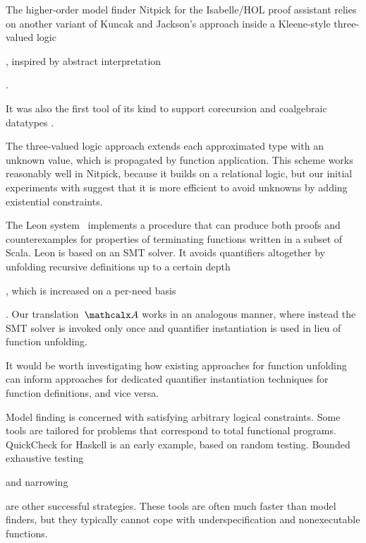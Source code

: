 The higher-order model finder Nitpick \cite{blanchette-nipkow-2010}
for the Isabelle/HOL proof assistant
relies on another variant of Kuncak and Jackson's approach inside a
Kleene-style three-valued logic\begin{rep}, inspired by abstract interpretation\end{rep}.
\begin{rep}It was also the first tool of its kind to support corecursion and
coalgebraic datatypes \cite{blanchette-2013-relational}.\end{rep}
The three-valued logic approach extends each
approximated type with an unknown value, which is propagated by function
application. This scheme works reasonably well in Nitpick, because it builds
on a relational logic, but our initial experiments with \cvc suggest
that it is more efficient to avoid unknowns by adding existential
constraints.

The Leon system~\cite{blanc2013overview} implements a procedure that can
produce both proofs and counter\-examples for properties of terminating functions
written in a subset of Scala. Leon is based on an SMT solver. It avoids
quantifiers altogether by unfolding recursive definitions up to a certain
depth\begin{rep}, which is increased on a per-need basis\end{rep}.
Our translation~$\conv$ works in an analogous manner, 
where instead the SMT solver is invoked only once 
and quantifier instantiation is used in lieu of function unfolding.
\begin{rep}It would be
worth investigating how existing approaches for function
unfolding can inform approaches for dedicated quantifier instantiation
techniques for function definitions, and vice versa.\end{rep}

Model finding is concerned with satisfying arbitrary logical constraints. Some
tools are tailored for problems that correspond to total functional
programs. QuickCheck \cite{claessen-hughes-2000} for Haskell is an
early example, based on random testing. Bounded exhaustive testing\begin{rep}
\cite{runciman-et-al-2008}\end{rep} and narrowing\begin{rep}
\cite{lindblad-2008-testing}\end{rep} are other successful strategies. These
tools are often much faster than model finders, but they typically cannot cope
with underspecification and nonexecutable functions.


